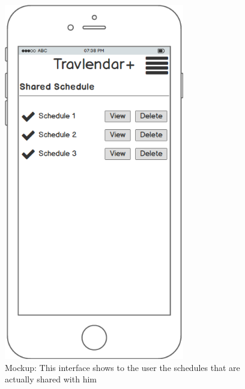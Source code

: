 \documentclass[numbers=noenddot, 12pt, a4paper, oneside]{scrbook}
\begin{document}
\begin{figure}[H]
	\centering
	\includegraphics[width=0.7\textwidth]{mockups/SharedSchedule}
	\caption{Mockup: This interface shows to the user the schedules that are actually shared with him}
\end{figure}
\end{document}
